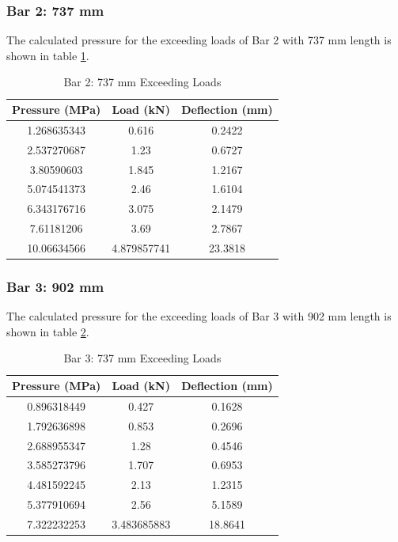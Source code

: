 \documentclass[12pt, titlepage]{article}
\begin{document}
\subsubsection{Bar 2: 737 mm}
The calculated pressure for the exceeding loads of Bar 2 with 737 mm length
is shown in table \ref{tab:bar2exceed}.
\begin{table}[H]
    \centering
    \caption{Bar 2: 737 mm Exceeding Loads}
    \label{tab:bar2exceed}
    \begin{tabular}{|c|c|c|}
        \hline
        \textbf{Pressure (MPa)} & \textbf{Load (kN)} & \textbf{Deflection (mm)}\\
        \hline
        1.268635343 & 0.616 & 0.2422 \\
        \hline
        2.537270687 & 1.23 & 0.6727 \\
        \hline
        3.80590603 & 1.845 & 1.2167 \\
        \hline
        5.074541373 & 2.46 & 1.6104 \\
        \hline
        6.343176716 & 3.075 & 2.1479 \\
        \hline
        7.61181206 & 3.69 & 2.7867 \\
        \hline
        10.06634566 & 4.879857741 & 23.3818 \\
        \hline
    \end{tabular}
\end{table}
\subsubsection{Bar 3: 902 mm}
The calculated pressure for the exceeding loads of Bar 3 with 902 mm length
is shown in table \ref{tab:bar3exceed}.
\begin{table}[H]
    \centering
    \caption{Bar 3: 737 mm Exceeding Loads}
    \label{tab:bar3exceed}
    \begin{tabular}{|c|c|c|}
        \hline
        \textbf{Pressure (MPa)} & \textbf{Load (kN)} & \textbf{Deflection (mm)}\\
        \hline
        0.896318449 & 0.427 & 0.1628 \\
        \hline
        1.792636898 & 0.853 & 0.2696 \\
        \hline
        2.688955347 & 1.28 & 0.4546 \\
        \hline
        3.585273796 & 1.707 & 0.6953 \\
        \hline
        4.481592245 & 2.13 & 1.2315 \\
        \hline
        5.377910694 & 2.56 & 5.1589 \\
        \hline
        7.322232253 & 3.483685883 & 18.8641 \\
        \hline
    \end{tabular}
\end{table}
\end{document}
